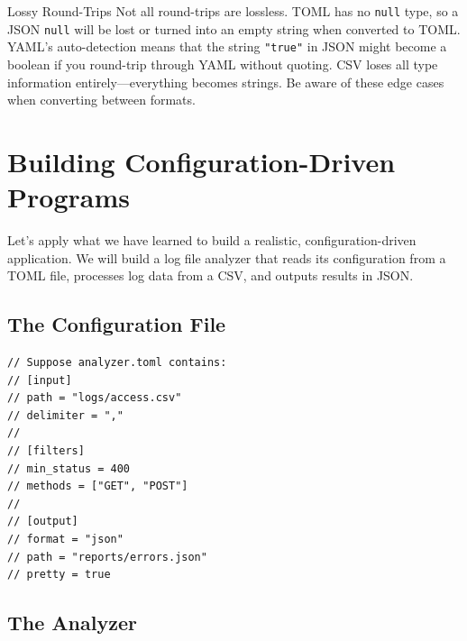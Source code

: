 \begin{notebox}{Lossy Round-Trips}
Not all round-trips are lossless. TOML has no \lstinline|null| type, so a
JSON \texttt{null} will be lost or turned into an empty string when
converted to TOML. YAML's auto-detection means that the string
\texttt{"true"} in JSON might become a boolean if you round-trip through
YAML without quoting. CSV loses all type information entirely---everything
becomes strings. Be aware of these edge cases when converting between
formats.
\end{notebox}

\section{Building Configuration-Driven Programs}\label{sec:config-driven}


Let's apply what we have learned to build a realistic, configuration-driven
application. We will build a log file analyzer that reads its configuration
from a TOML file, processes log data from a CSV, and outputs results in
JSON.

\subsection{The Configuration File}

\begin{lstlisting}[language=Lattice, caption={analyzer.toml --- configuration file}]
// Suppose analyzer.toml contains:
// [input]
// path = "logs/access.csv"
// delimiter = ","
//
// [filters]
// min_status = 400
// methods = ["GET", "POST"]
//
// [output]
// format = "json"
// path = "reports/errors.json"
// pretty = true
\end{lstlisting}

\subsection{The Analyzer}

